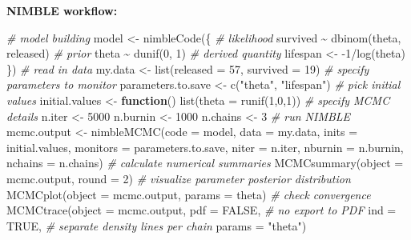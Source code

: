 \documentclass[
  12pt,
]{krantz}
\newenvironment{Shaded}{\begin{snugshade}}{\end{snugshade}}
\newcommand{\AttributeTok}[1]{\textcolor[rgb]{0.77,0.63,0.00}{#1}}
\newcommand{\CommentTok}[1]{\textcolor[rgb]{0.56,0.35,0.01}{\textit{#1}}}
\newcommand{\ConstantTok}[1]{\textcolor[rgb]{0.00,0.00,0.00}{#1}}
\newcommand{\ControlFlowTok}[1]{\textcolor[rgb]{0.13,0.29,0.53}{\textbf{#1}}}
\newcommand{\DecValTok}[1]{\textcolor[rgb]{0.00,0.00,0.81}{#1}}
\newcommand{\FunctionTok}[1]{\textcolor[rgb]{0.00,0.00,0.00}{#1}}
\newcommand{\NormalTok}[1]{#1}
\newcommand{\OtherTok}[1]{\textcolor[rgb]{0.56,0.35,0.01}{#1}}
\newcommand{\SpecialCharTok}[1]{\textcolor[rgb]{0.00,0.00,0.00}{#1}}
\newcommand{\StringTok}[1]{\textcolor[rgb]{0.31,0.60,0.02}{#1}}
\begin{document}
\textbf{NIMBLE workflow:}

\begin{Shaded}
\begin{Highlighting}[]
\CommentTok{\# model building}
\NormalTok{model }\OtherTok{\textless{}{-}} \FunctionTok{nimbleCode}\NormalTok{(\{}
  \CommentTok{\# likelihood}
\NormalTok{  survived }\SpecialCharTok{\textasciitilde{}} \FunctionTok{dbinom}\NormalTok{(theta, released)}
  \CommentTok{\# prior}
\NormalTok{  theta }\SpecialCharTok{\textasciitilde{}} \FunctionTok{dunif}\NormalTok{(}\DecValTok{0}\NormalTok{, }\DecValTok{1}\NormalTok{)}
  \CommentTok{\# derived quantity}
\NormalTok{  lifespan }\OtherTok{\textless{}{-}} \SpecialCharTok{{-}}\DecValTok{1}\SpecialCharTok{/}\FunctionTok{log}\NormalTok{(theta)}
\NormalTok{\})}
\CommentTok{\# read in data}
\NormalTok{my.data }\OtherTok{\textless{}{-}} \FunctionTok{list}\NormalTok{(}\AttributeTok{released =} \DecValTok{57}\NormalTok{, }\AttributeTok{survived =} \DecValTok{19}\NormalTok{)}
\CommentTok{\# specify parameters to monitor}
\NormalTok{parameters.to.save }\OtherTok{\textless{}{-}} \FunctionTok{c}\NormalTok{(}\StringTok{"theta"}\NormalTok{, }\StringTok{"lifespan"}\NormalTok{)}
\CommentTok{\# pick initial values}
\NormalTok{initial.values }\OtherTok{\textless{}{-}} \ControlFlowTok{function}\NormalTok{() }\FunctionTok{list}\NormalTok{(}\AttributeTok{theta =} \FunctionTok{runif}\NormalTok{(}\DecValTok{1}\NormalTok{,}\DecValTok{0}\NormalTok{,}\DecValTok{1}\NormalTok{))}
\CommentTok{\# specify MCMC details}
\NormalTok{n.iter }\OtherTok{\textless{}{-}} \DecValTok{5000}
\NormalTok{n.burnin }\OtherTok{\textless{}{-}} \DecValTok{1000}
\NormalTok{n.chains }\OtherTok{\textless{}{-}} \DecValTok{3}
\CommentTok{\# run NIMBLE}
\NormalTok{mcmc.output }\OtherTok{\textless{}{-}} \FunctionTok{nimbleMCMC}\NormalTok{(}\AttributeTok{code =}\NormalTok{ model,}
                          \AttributeTok{data =}\NormalTok{ my.data,}
                          \AttributeTok{inits =}\NormalTok{ initial.values,}
                          \AttributeTok{monitors =}\NormalTok{ parameters.to.save,}
                          \AttributeTok{niter =}\NormalTok{ n.iter,}
                          \AttributeTok{nburnin =}\NormalTok{ n.burnin,}
                          \AttributeTok{nchains =}\NormalTok{ n.chains)}
\CommentTok{\# calculate numerical summaries}
\FunctionTok{MCMCsummary}\NormalTok{(}\AttributeTok{object =}\NormalTok{ mcmc.output, }\AttributeTok{round =} \DecValTok{2}\NormalTok{)}
\CommentTok{\# visualize parameter posterior distribution}
\FunctionTok{MCMCplot}\NormalTok{(}\AttributeTok{object =}\NormalTok{ mcmc.output, }
         \AttributeTok{params =} \StringTok{\textquotesingle{}theta\textquotesingle{}}\NormalTok{)}
\CommentTok{\# check convergence}
\FunctionTok{MCMCtrace}\NormalTok{(}\AttributeTok{object =}\NormalTok{ mcmc.output,}
          \AttributeTok{pdf =} \ConstantTok{FALSE}\NormalTok{, }\CommentTok{\# no export to PDF}
          \AttributeTok{ind =} \ConstantTok{TRUE}\NormalTok{, }\CommentTok{\# separate density lines per chain}
          \AttributeTok{params =} \StringTok{"theta"}\NormalTok{)}
\end{Highlighting}
\end{Shaded}
\end{document}
